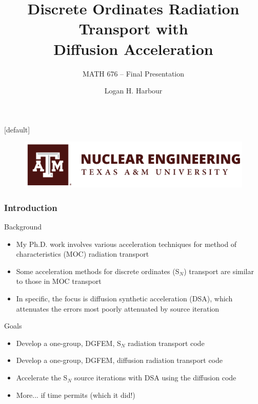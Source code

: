 \documentclass[xcolor={usenames,dvipsnames,svgnames,table}, 10pt]{beamer}
\title[S$_N$ with Diffusion Acceleration]{Discrete Ordinates Radiation Transport with\\Diffusion Acceleration\\[0.3cm]}
\subtitle{MATH 676 -- Final Presentation}
\author[Logan Harbour]{Logan H. Harbour}
\institute[]{Department of Nuclear Engineering \\ Texas A\&M University}
\date[May 1, 2019]
\begin{document}
{
[default] 
\begin{frame}
\vfill
\titlepage
\vfill
\begin{figure}[t]
	\centering
	\includegraphics[width=.5\textwidth]{images/nuen}
\end{figure}
\vfill
\end{frame}
}


\begin{frame}\frametitle{Introduction}
	\vfill
	\begin{block}{Background}
		\begin{itemize} 
			\setlength\itemsep{0.2em}
			\item My Ph.D. work involves various acceleration techniques for method of characteristics (MOC) radiation transport
			\item Some acceleration methods for discrete ordinates (S$_N$) transport are similar to those in MOC transport
			\item In specific, the focus is diffusion synthetic acceleration (DSA), which attenuates the errors most poorly attenuated by source iteration
		\end{itemize}
	\end{block}
	\vfill
	\begin{block}{Goals}
		\begin{itemize}
			\setlength\itemsep{0.2em}
			\item Develop a one-group, DGFEM, S$_N$ radiation transport code
			\item Develop a one-group, DGFEM, diffusion radiation transport code
			\item Accelerate the S$_N$ source iterations with DSA using the diffusion code
			\item More... if time permits (which it did!)
		\end{itemize}
	\end{block}
	\vfill
\end{frame}

\end{document}
